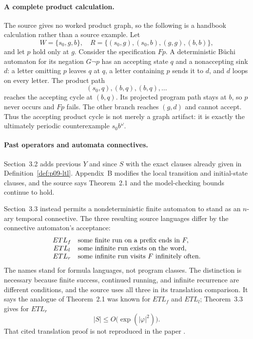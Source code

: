 \paragraph{A complete product calculation.}
The source gives no worked product graph, so the following is a handbook
calculation rather than a source example.  Let
\[
 W=\{s_0,g,b\},
 \quad
 R=\{(s_0,g),(s_0,b),(g,g),(b,b)\},
\]
and let \(p\) hold only at \(g\).  Consider the specification \(Fp\).  A
deterministic B\"uchi automaton for its negation \(G\neg p\) has an accepting
state \(q\) and a nonaccepting sink \(d\): a letter omitting \(p\) leaves
\(q\) at \(q\), a letter containing \(p\) sends it to \(d\), and \(d\)
loops on every letter.  The product path
\[
 (s_0,q),(b,q),(b,q),\ldots
\]
reaches the accepting cycle at \((b,q)\).  Its projected program path stays at
\(b\), so \(p\) never occurs and \(Fp\) fails.  The other branch reaches
\((g,d)\) and cannot accept.  Thus the accepting product cycle is not merely
a graph artifact: it is exactly the ultimately periodic counterexample
\(s_0b^\omega\).

\paragraph{Past operators and automata connectives.}
Section~3.2 adds previous \(Y\) and since \(S\) with the exact clauses already
given in Definition~\ref{def:p09-ltl}.  Appendix~B modifies the local
transition and initial-state clauses, and the source says Theorem~2.1 and the
model-checking bounds continue to hold.

Section~3.3 instead permits a nondeterministic finite automaton to stand as an
\(n\)-ary temporal connective.  The three resulting source languages differ
by the connective automaton's acceptance:
\[
\begin{array}{c@{\quad}l}
 ETL_f & \text{some finite run on a prefix ends in }F,\\
 ETL_l & \text{some infinite run exists on the word},\\
 ETL_r & \text{some infinite run visits }F\text{ infinitely often}.
\end{array}
\]
The names stand for formula languages, not program classes.  The distinction
is necessary because finite success, continued running, and infinite
recurrence are different conditions, and the source uses all three in its
translation comparison.  It says the analogue of Theorem~2.1 was known for
\(ETL_f\) and \(ETL_l\); Theorem~3.3 gives for \(ETL_r\)
\[
 |S|\le O\bigl(\exp(|\varphi|^2)\bigr).
\]
That cited translation proof is not reproduced in the paper
\cite[preprint p.~6 and app.~A]{VardiWolper1986}.

